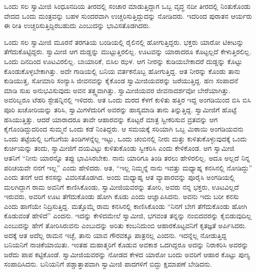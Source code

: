  ಒಂದು ಸಲ ಸ್ವಾಮೀಜಿ ಸಿಂಧೂನದಿಯ ತೀರದಲ್ಲಿ ಸಂಚಾರ ಮಾಡುತ್ತಿದ್ದಾಗ ಒಬ್ಬ ವೃದ್ಧ ನದೀ ತೀರದಲ್ಲಿ ನಿಂತುಕೊಂಡು ವೇದದ ಒಂದು ಮಂತ್ರವನ್ನು ಬಹಳ ಸುಂದರವಾಗಿ ಉಚ್ಚರಿಸುತ್ತಿದ್ದುದನ್ನು ನೋಡಿದರು. ಇದರಿಂದ ಪುರಾತನ ಆರ್ಯರು ಈ ರೀತಿ ಉಚ್ಚರಿಸುತ್ತಿದ್ದಿರಬಹುದು ಎಂಬುದನ್ನು ಭಾವಿಸತೊಡಗಿದರು. 

 ಒಂದು ಸಲ ಸ್ವಾಮೀಜಿ ಮೂರನೆ ತರಗತಿಯ ಬಂಡಿಯಲ್ಲಿ ರೈಲಿನಲ್ಲಿ ಹೋಗುತ್ತಿದ್ದರು. ಭಕ್ತರು ಯಾರೋ ಟಿಕೀಟನ್ನು ತೆಗೆದುಕೊಟ್ಟಿದ್ದರು. ಸ್ವಾಮೀಜಿ ಆಗ ದುಡ್ಡನ್ನು ಮುಟ್ಟುತ್ತಿರಲಿಲ್ಲ. ಊಟವನ್ನು ಯಾರಾದರೂ ಕೊಟ್ಟಲ್ಲದೆ ಕೇಳುತ್ತಿರಲಿಲ್ಲ. ಒಂದು ದಿನದಿಂದ ಊಟವಿರಲಿಲ್ಲ. ಬಾಯಾರಿಕೆ, ಬಿಸಿಲ ಝಳ. ಆಗ ನೀರನ್ನು ಕುಡಿಯಬೇಕಾದರೆ ದುಡ್ಡನ್ನು ಕೊಟ್ಟು ಕೊಂಡುಕೊಳ್ಳಬೇಕಾಗಿತ್ತು. ಅದೇ ಗಾಡಿಯಲ್ಲಿ ಬನಿಯ ವರ್ತಕನೊಬ್ಬ ಹೋಗುತ್ತಿದ್ದ. ಆತ ನೀರನ್ನು ಕೊಂಡು ತಾನು ಕುಡಿಯುತ್ತ, ಸೋಮಾರಿ ಸಂನ್ಯಾಸಿ ಜೀವನವನ್ನು ಕೈಕೊಂಡ ಸ್ವಾಮೀಜಿಯವರನ್ನು ಜರೆಯುತ್ತಿದ್ದ. ಹಣ ಸಂಪಾದನೆ ಮಾಡಿ ಸುಖ ಅನುಭವಿಸುವುದು ಅವನ ತತ್ತ್ವವಾಗಿತ್ತು. ಸ್ವಾಮೀಜಿಯವರ ಜೀವನಾದರ್ಶವೋ ಬೇರೆಯಾಗಿತ್ತು. ಅವರಿಬ್ಬರೂ ಟೆಹರಿ ಸ್ಟೇಷನ್ನಿನಲ್ಲಿ ಇಳಿದರು. ಆತ ಒಂದು ಮರದ ಕೆಳಗೆ ಕುಳಿತು ಹತ್ತಿರ ಇದ್ದ ಅಂಗಡಿಯಿಂದ ಬಿಸಿ ಬಿಸಿ ಪೂರಿ ಖಚೋರಿಯನ್ನು ತರಿಸಿ, ಸ್ವಾಮಿಗಳೆದುರಿಗೆ ಅವರನ್ನು ಹಾಸ್ಯಮಾಡಿ ತಾನು ತಿನ್ನುತ್ತಿದ್ದ. ಸ್ವಾಮೀಜಿಗೆ ಹೊಟ್ಟೆ ಹಸಿಯುತ್ತಿತ್ತು. ಆದರೆ ಯಾರಾದರೂ ತಾವೇ ಆಹಾರವನ್ನು ಕೊಟ್ಟರೆ ಮಾತ್ರ ಸ್ವೀಕರಿಸುವ ವ್ರತವನ್ನು ಆಗ ಕೈಗೊಂಡಿದ್ದುದರಿಂದ ಸುಮ್ಮನೆ ಒಂದು ಕಡೆ ನಿಂತಿದ್ದರು. ಆ ಸಮಯಕ್ಕೆ ಸರಿಯಾಗಿ ಒಬ್ಬ ಮಿಠಾಯಿ ಅಂಗಡಿಯವನು ಒಂದು ತಟ್ಟೆಯಲ್ಲಿ ಬಗೆಬಗೆಯ ತಿಂಡಿಗಳನ್ನೆಲ್ಲ ಇಟ್ಟು, ಒಂದು ಚಂಬಿನಲ್ಲಿ ನೀರು ಮತ್ತು ಕುಳಿತುಕೊಳ್ಳುವುದಕ್ಕೆ ಒಂದು ಕುರ್ಚಿಯನ್ನು ತಂದು, ಸ್ವಾಮೀಜಿಗೆ ದಯವಿಟ್ಟು ಕುಳಿತುಕೊಂಡು ಸ್ವೀಕರಿಸಿ ಎಂದು ಕೇಳಿಕೊಂಡ. ಆಗ ಸ್ವಾಮೀಜಿ ಆತನಿಗೆ “ನೀನು ಯಾರನ್ನೊ ತಪ್ಪು ಭಾವಿಸಿರಬೇಕು. ನಾನು ಯಾರಿಗೂ ತಿಂಡಿ ತರಲು ಹೇಳಿರಲಿಲ್ಲ. ಅದೂ ಅಲ್ಲದೆ ನಿನ್ನ ಪರಿಚಯವೇ ನನಗೆ ಇಲ್ಲ” ಎಂದು ಹೇಳಿದರು. ಆತ, “ಇಲ್ಲ ನಿಮ್ಮನ್ನೆ ನಾನು ಇವತ್ತು ಮಧ್ಯಾಹ್ನ ಕನಸಿನಲ್ಲಿ ನೋಡಿದ್ದು” ಎಂದು ತನಗೆ ಆದ ಕನಸನ್ನು ವಿವರಿಸತೊಡಗಿದ. ಅಂದು ಮಧ್ಯಾಹ್ನ ಆತ ವ್ಯಾಪಾರವನ್ನು ಪೂರೈಸಿ ಅಂಗಡಿಯಲ್ಲಿ ಮಲಗಿದ್ದಾಗ ರಾಮ ಅವನಿಗೆ ಕಾಣಿಸಿಕೊಂಡು, ಸ್ವಾಮೀಜಿಯವರನ್ನು ತೋರಿ, ಅವರು ನನ್ನ ಭಕ್ತರು, ಊಟವಿಲ್ಲದೆ ಇರುವರು, ಅವರಿಗೆ ಊಟ ತೆಗೆದುಕೊಂಡು ಹೋಗಿ ಕೊಡು ಎಂದು ಆಜ್ಞಾಪಿಸಿದನು. ಅವನು ಇದು ಬರೀ ಕನಸು ಎಂದು ಹಾಗೆಯೇ ನಿದ್ರಿಸುತ್ತಿದ್ದ. ಮತ್ತೊಮ್ಮೆ ರಾಮ ಕನಸಿನಲ್ಲಿ ಕಾಣಿಸಿಕೊಂಡು “ನಿನಗೆ ಬೇಗ ತೆಗೆದುಕೊಂಡು ಹೋಗಿ ಕೊಡುವಂತೆ ಹೇಳಿದೆ” ಎಂದನು. ಇದನ್ನು ಕೇಳಿದಮೇಲೆ ಸ್ವಾಮೀಜಿ, ಭಗವಂತ ತನ್ನನ್ನು ನಂಬಿದವರನ್ನು ಕೈಬಿಡುವುದಿಲ್ಲ ಎಂಬುದನ್ನು ಹೇಗೆ ತೋರಿಸಿರುವನು ಎಂಬುದನ್ನು ಅರಿತು ಕಂಬನಿದುಂಬಿ ಆಹಾರಕೊಟ್ಟವನಿಗೆ ಕೃತಜ್ಞತೆ ಅರ್ಪಿಸಿದರು. ಅದಕ್ಕೆ ಆತ ಅದೆಲ್ಲ ರಾಮನ ಇಚ್ಛೆ, ತಾನು ಯಾವ ಗೌರವಕ್ಕೂ ಪಾತ್ರನಲ್ಲ ಎಂದನು. ಇದನ್ನೆಲ್ಲ ನೋಡುತ್ತಿದ್ದ ಬನಿಯನಿಗೆ ನಾಚಿಕೆಯಾಯಿತು. ಇಂತಹ ಮಹಾತ್ಮರಿಗೆ ಕೊಡುವ ಅವಕಾಶ ಒದಗಿದ್ದರೂ ಅದನ್ನು ನಿರಾಕರಿಸಿ ಅವರನ್ನು ಜರೆದು ಪಾಪ ಕಟ್ಟಿಕೊಂಡೆ. ಸ್ವಾಮೀಜಿಯವರನ್ನು ನೋಡದ ಕೇಳದ ಯಾರೋ ಬಂದು ಅವರಿಗೆ ಆಹಾರ ಕೊಟ್ಟು ಪುಣ್ಯ ಸಂಪಾದಿಸಿದನು. ಬನಿಯನಿಗೆ ಪಶ್ಚಾತ್ತಾಪವಾಗಿ ಸ್ವಾಮೀಜಿ ಪಾದಗಳಿಗೆ ಬಿದ್ದು ಕ್ಷಮಾಪಣೆ ಬೇಡಿದನು. 


